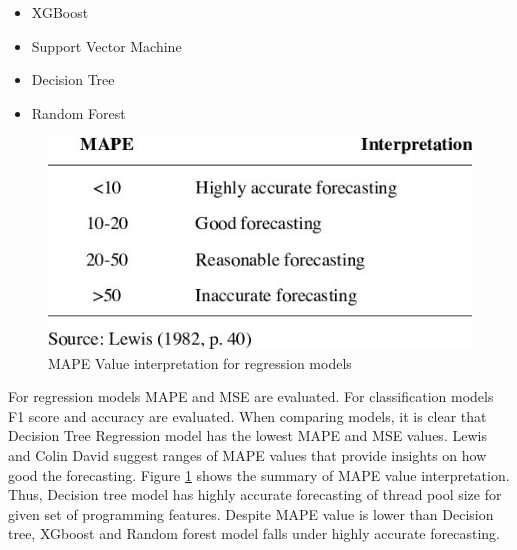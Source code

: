 \begin{itemize}
	
	\item XGBoost
	\item Support Vector Machine
	\item Decision Tree
	\item Random Forest
	
\end{itemize}


\begin{figure}[htbp]
	\begin{center}
		\includegraphics[scale=1]{figures/MAPE-values.jpg}
	\end{center}
	\caption{\acrfull{MAPE} Value interpretation for regression models}
	\label{MAPE_forcasting}
\end{figure}

For regression models \acrfull{MAPE} and \acrfull{MSE} are evaluated. For classification models F1 score and accuracy are evaluated. When comparing models, it is clear that Decision Tree Regression model has the lowest \acrfull{MAPE} and \acrfull{MSE} values. Lewis and Colin David \cite{lewis1982industrial} suggest ranges of MAPE values that provide insights on how good the forecasting. Figure \ref{MAPE_forcasting} shows the summary of MAPE value interpretation. Thus, Decision tree model has highly accurate forecasting of thread pool size for given set of programming features. Despite MAPE value is lower than Decision tree, XGboost and Random forest model falls under  highly accurate forecasting.

